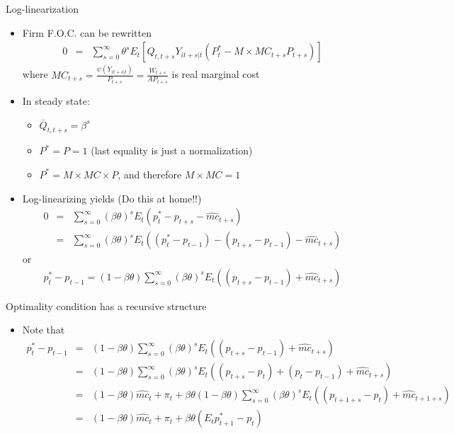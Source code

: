 \documentclass[9pt,xcolor={dvipsnames}]{beamer}
\newcommand{\bit}{\begin{itemize}}
\newcommand{\eit}{\end{itemize}}
\newcommand{\rc}{\color{red}}
\begin{document}
\begin{frame}{Log-linearization}

\bit
\setlength\itemsep{1em}

\item Firm F.O.C. can be rewritten
\begin{eqnarray}
0 &=& \sum_{s=0}^{\infty} \theta^s E_t \left[Q_{t,t+s} Y_{it+s|t} \left( P_t^* - M \times MC_{t+s} P_{t+s} \right) \right] \nonumber 
\end{eqnarray}
where $MC_{t+s} = \frac{\psi (Y_{it+s|t})}{P_{t+s}} = \frac{W_{t+s}}{A P_{t+s}} $ is real marginal cost

\item In steady state:
\bit
	\item $\bar Q_{t,t+s} = \beta^s$
	\item $P^*=P=1$ (last equality is just a normalization)
	\item $P^* = M \times MC \times P$, and therefore $M \times MC = 1$
\eit

\item Log-linearizing yields {\rc (Do this at home!!)}
\begin{eqnarray}
0 &=& \sum_{s=0}^{\infty} (\beta \theta)^s E_t \left( p^*_t-p_{t+s}- \widehat{mc}_{t+s}  \right) \nonumber \\
&=& \sum_{s=0}^{\infty} (\beta \theta)^s E_t \left( (p^*_t-p_{t-1})-(p_{t+s}-p_{t-1}) - \widehat{mc}_{t+s}  \right) \nonumber
\end{eqnarray}
or
\begin{eqnarray}
p^*_t-p_{t-1}= (1-\beta \theta) \sum_{s=0}^{\infty} (\beta \theta)^s E_t \left((p_{t+s}-p_{t-1}) + \widehat{mc}_{t+s}  \right) \nonumber
\end{eqnarray}


\eit

\end{frame}


\begin{frame}{Optimality condition has a recursive structure}
\small

\bit
\setlength\itemsep{1em}

\item Note that
\begin{eqnarray}
p^*_t-p_{t-1} &=& (1-\beta \theta) \sum_{s=0}^{\infty} (\beta \theta)^s E_t \left((p_{t+s}-p_{t-1}) + \widehat{mc}_{t+s}  \right) \nonumber  \\
&=& (1-\beta \theta) \sum_{s=0}^{\infty} (\beta \theta)^s E_t \left((p_{t+s}-p_t) + (p_t-p_{t-1}) + \widehat{mc}_{t+s}  \right) \nonumber  \\
&=& (1-\beta \theta) \widehat{mc}_t + \pi_t + \beta \theta (1-\beta \theta) \sum_{s=0}^{\infty} (\beta \theta)^s E_t \left((p_{t+1+s}-p_{t}) + \widehat{mc}_{t+1+s}  \right)  \nonumber  \\
&=& (1-\beta \theta) \widehat{mc}_t + \pi_t  + \beta \theta (E_t p^*_{t+1}-p_{t}) \nonumber 
\end{eqnarray}

\eit

\end{frame}
\end{document}
